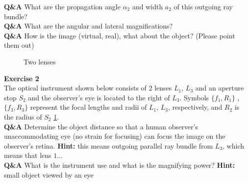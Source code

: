 \documentclass[main.tex]{subfiles}
\begin{document}
\textbf{Q\&A} What are the propagation angle $\alpha_2$ and width $a_2$ of this outgoing ray bundle? \\

\textbf{Q\&A} What are the angular and lateral magnifications?\\

\textbf{Q\&A} How is the image (virtual, real), what about the object? (Please point them out)\\


\newpage

\begin{figure}
\centering{}
\caption{Two lenses}
\label{fig:2_2}
\end{figure}

\textbf{Exercise 2}\\
The optical instrument shown below consists of 2 lenses $L_1$, $L_3$ and an aperture stop $S_2$ and the observer's eye is located to the right of $L_3$. Symbols $\{f_1 , R_1\}$ , $\{f_3 , R_3\}$ represent the focal lengths and radii of $L_1$, $L_3$, respectively, and $R_2$ is the radius of $S_2$ \ref{fig:2_2}.\\

\textbf{Q\&A} Determine the object distance so that a human observer's unaccommodating eye (no strain for focusing) can focus the image on the observer's retina. \textbf{Hint:} this means outgoing parallel ray bundle from $L_3$, which means that lens $1 ...$\\

\textbf{Q\&A} What is the instrument use and what is the magnifying power? \textbf{Hint:} small object viewed by an eye
\end{document}
